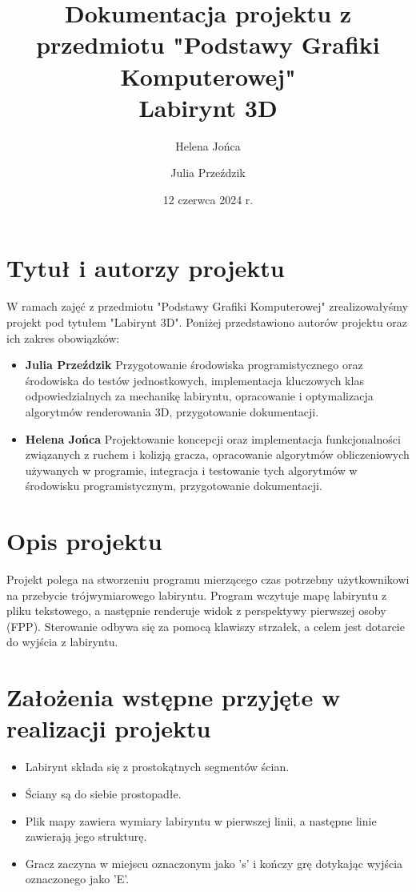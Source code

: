 \documentclass{article}
\begin{document}
\Large


\title{\LARGE Dokumentacja projektu z przedmiotu "Podstawy Grafiki Komputerowej" \\
       \Large Labirynt 3D}
\author{Helena Jońca \and Julia Przeździk}
\date{12 czerwca 2024 r.}
\maketitle


\normalsize
\section{Tytuł i autorzy projektu}
W ramach zajęć z przedmiotu "Podstawy Grafiki Komputerowej" zrealizowałyśmy projekt pod tytułem "Labirynt 3D". Poniżej przedstawiono autorów projektu oraz ich zakres obowiązków:

\begin{itemize}
    \item \textbf{Julia Przeździk} Przygotowanie środowiska programistycznego oraz środowiska do testów jednostkowych, implementacja kluczowych klas odpowiedzialnych za mechanikę labiryntu, opracowanie i optymalizacja algorytmów renderowania 3D, przygotowanie dokumentacji.
    \item \textbf{Helena Jońca} Projektowanie koncepcji oraz implementacja funkcjonalności związanych z ruchem i kolizją gracza, opracowanie algorytmów obliczeniowych używanych w programie, integracja i testowanie tych algorytmów w środowisku programistycznym, przygotowanie dokumentacji.
\end{itemize}

\section{Opis projektu}
Projekt polega na stworzeniu programu mierzącego czas potrzebny użytkownikowi na przebycie trójwymiarowego labiryntu. Program wczytuje mapę labiryntu z pliku tekstowego, a następnie renderuje widok z perspektywy pierwszej osoby (FPP). Sterowanie odbywa się za pomocą klawiszy strzałek, a celem jest dotarcie do wyjścia z labiryntu.

\section{Założenia wstępne przyjęte w realizacji projektu}
\begin{itemize}
    \item Labirynt składa się z prostokątnych segmentów ścian.
    \item Ściany są do siebie prostopadłe.
    \item Plik mapy zawiera wymiary labiryntu w pierwszej linii, a następne linie zawierają jego strukturę.
    \item Gracz zaczyna w miejscu oznaczonym jako 's' i kończy grę dotykając wyjścia oznaczonego jako 'E'.
\end{itemize}
\end{document}
